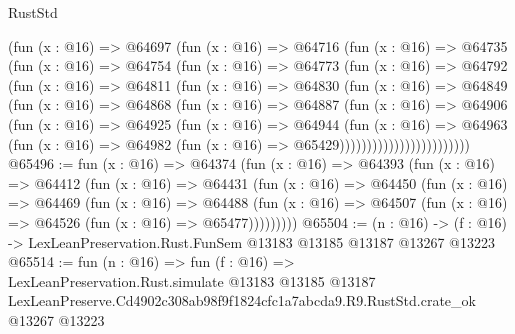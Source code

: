 \begin{lexlean}{RustStd}
\begin{coremodule}
                  (fun (x : @16) =>
                  @64697
                    (fun (x : @16) =>
                    @64716
                      (fun (x : @16) =>
                      @64735
                        (fun (x : @16) =>
                        @64754
                          (fun (x : @16) =>
                          @64773
                            (fun (x : @16) =>
                            @64792
                              (fun (x : @16) =>
                              @64811
                                (fun (x : @16) =>
                                @64830
                                  (fun (x : @16) =>
                                  @64849
                                    (fun (x : @16) =>
                                    @64868
                                      (fun (x : @16) =>
                                      @64887
                                        (fun (x : @16) =>
                                        @64906
                                          (fun (x : @16) =>
                                          @64925
                                            (fun (x : @16) =>
                                            @64944
                                              (fun (x : @16) =>
                                              @64963
                                                (fun (x : @16) =>
                                                @64982
                                                  (fun (x : @16) => @65429))))))))))))))))))))))))
@65496 := fun (x : @16) =>
  @64374
    (fun (x : @16) =>
    @64393
      (fun (x : @16) =>
      @64412
        (fun (x : @16) =>
        @64431
          (fun (x : @16) =>
          @64450
            (fun (x : @16) =>
            @64469
              (fun (x : @16) =>
              @64488
                (fun (x : @16) => @64507 (fun (x : @16) => @64526 (fun (x : @16) => @65477)))))))))
@65504 := (n : @16) ->
  (f : @16) -> LexLeanPreservation.Rust.FunSem @13183 @13185 @13187 @13267 @13223
@65514 := fun (n : @16) =>
  fun (f : @16) =>
  LexLeanPreservation.Rust.simulate
    @13183
    @13185
    @13187
    LexLeanPreserve.Cd4902c308ab98f9f1824cfc1a7abcda9.R9.RustStd.crate_ok
    @13267
    @13223
\end{coremodule}
\end{lexlean}
